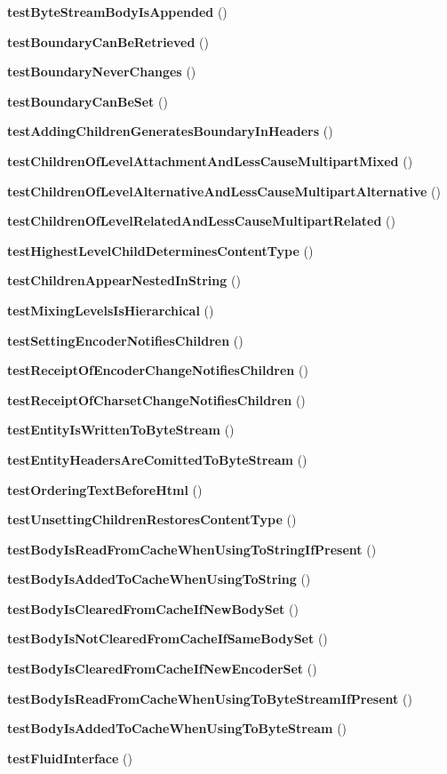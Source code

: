 \begin{DoxyCompactItemize}
\item 
{\bf test\+Byte\+Stream\+Body\+Is\+Appended} ()
\item 
{\bf test\+Boundary\+Can\+Be\+Retrieved} ()
\item 
{\bf test\+Boundary\+Never\+Changes} ()
\item 
{\bf test\+Boundary\+Can\+Be\+Set} ()
\item 
{\bf test\+Adding\+Children\+Generates\+Boundary\+In\+Headers} ()
\item 
{\bf test\+Children\+Of\+Level\+Attachment\+And\+Less\+Cause\+Multipart\+Mixed} ()
\item 
{\bf test\+Children\+Of\+Level\+Alternative\+And\+Less\+Cause\+Multipart\+Alternative} ()
\item 
{\bf test\+Children\+Of\+Level\+Related\+And\+Less\+Cause\+Multipart\+Related} ()
\item 
{\bf test\+Highest\+Level\+Child\+Determines\+Content\+Type} ()
\item 
{\bf test\+Children\+Appear\+Nested\+In\+String} ()
\item 
{\bf test\+Mixing\+Levels\+Is\+Hierarchical} ()
\item 
{\bf test\+Setting\+Encoder\+Notifies\+Children} ()
\item 
{\bf test\+Receipt\+Of\+Encoder\+Change\+Notifies\+Children} ()
\item 
{\bf test\+Receipt\+Of\+Charset\+Change\+Notifies\+Children} ()
\item 
{\bf test\+Entity\+Is\+Written\+To\+Byte\+Stream} ()
\item 
{\bf test\+Entity\+Headers\+Are\+Comitted\+To\+Byte\+Stream} ()
\item 
{\bf test\+Ordering\+Text\+Before\+Html} ()
\item 
{\bf test\+Unsetting\+Children\+Restores\+Content\+Type} ()
\item 
{\bf test\+Body\+Is\+Read\+From\+Cache\+When\+Using\+To\+String\+If\+Present} ()
\item 
{\bf test\+Body\+Is\+Added\+To\+Cache\+When\+Using\+To\+String} ()
\item 
{\bf test\+Body\+Is\+Cleared\+From\+Cache\+If\+New\+Body\+Set} ()
\item 
{\bf test\+Body\+Is\+Not\+Cleared\+From\+Cache\+If\+Same\+Body\+Set} ()
\item 
{\bf test\+Body\+Is\+Cleared\+From\+Cache\+If\+New\+Encoder\+Set} ()
\item 
{\bf test\+Body\+Is\+Read\+From\+Cache\+When\+Using\+To\+Byte\+Stream\+If\+Present} ()
\item 
{\bf test\+Body\+Is\+Added\+To\+Cache\+When\+Using\+To\+Byte\+Stream} ()
\item 
{\bf test\+Fluid\+Interface} ()
\end{DoxyCompactItemize}
